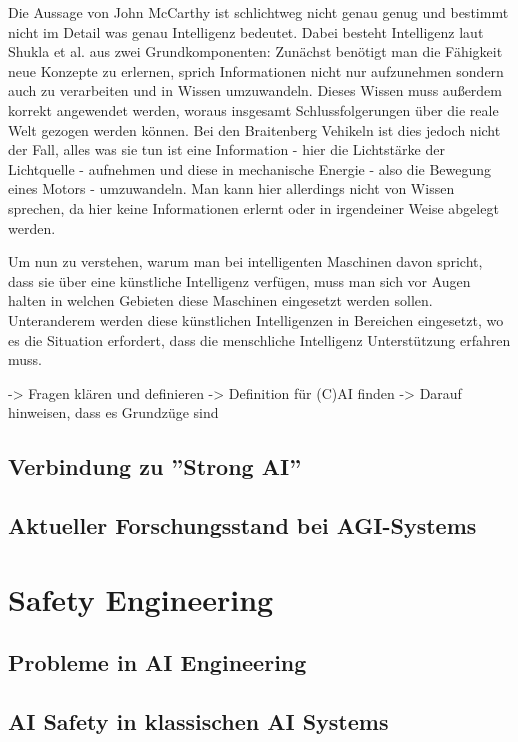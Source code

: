     Die Aussage von John McCarthy ist schlichtweg nicht genau genug und bestimmt nicht im Detail was
    genau Intelligenz bedeutet. Dabei besteht Intelligenz laut Shukla et al. aus zwei Grundkomponenten: 
    Zunächst benötigt man die Fähigkeit neue Konzepte zu erlernen, sprich Informationen nicht nur 
    aufzunehmen sondern auch zu verarbeiten und in Wissen umzuwandeln. Dieses Wissen muss außerdem 
    korrekt angewendet werden, woraus insgesamt Schlussfolgerungen über die reale Welt gezogen werden 
    können. \cite{shukla2013applicability} Bei den Braitenberg Vehikeln ist dies jedoch nicht der Fall,
    alles was sie tun ist eine Information - hier die Lichtstärke der Lichtquelle - aufnehmen und diese
    in mechanische Energie - also die Bewegung eines Motors - umzuwandeln. Man kann hier allerdings nicht
    von Wissen sprechen, da hier keine Informationen erlernt oder in irgendeiner Weise abgelegt werden.
    
    Um nun zu verstehen, warum man bei intelligenten Maschinen davon spricht, dass sie über eine 
    künstliche Intelligenz verfügen, muss man sich vor Augen halten in welchen Gebieten diese Maschinen
    eingesetzt werden sollen. Unteranderem werden diese künstlichen Intelligenzen in Bereichen eingesetzt,
    wo es die Situation erfordert, dass die menschliche Intelligenz Unterstützung erfahren muss.
        
    
    
    -> Fragen klären und definieren
    -> Definition für (C)AI finden
    -> Darauf hinweisen, dass es Grundzüge sind
    
    \subsection{Verbindung zu ''Strong AI''}
    \subsection{Aktueller Forschungsstand bei AGI-Systems}
    
\section{Safety Engineering}
    \subsection{Probleme in AI Engineering}
    \subsection{AI Safety in klassischen AI Systems}
